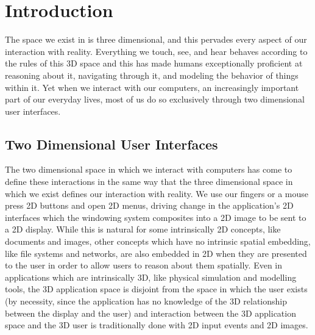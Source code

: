 \chapter{Introduction}
The space we exist in is three dimensional, and this pervades every aspect of our interaction with reality. Everything we touch, see, and hear behaves according to the rules of this 3D space and this has made humans exceptionally proficient at reasoning about it, navigating through it, and modeling the behavior of things within it. Yet when we interact with our computers, an increasingly important part of our everyday lives, most of us do so exclusively through two dimensional user interfaces. 
 
\section{Two Dimensional User Interfaces}

The two dimensional space in which we interact with computers has come to define these interactions in the same way that the three dimensional space in which we exist defines our interaction with reality. We use our fingers or a mouse press 2D buttons and open 2D menus, driving change in the application’s 2D interfaces which the windowing system composites into a 2D image to be sent to a 2D display. While this is natural for some intrinsically 2D concepts, like documents and images, other concepts which have no intrinsic spatial embedding, like file systems and networks, are also embedded in 2D when they are presented to the user in order to allow users to reason about them spatially. Even in applications which are intrinsically 3D, like physical simulation and modelling tools, the 3D application space is disjoint from the space in which the user exists (by necessity, since the application has no knowledge of the 3D relationship between the display and the user) and interaction between the 3D application space and the 3D user is traditionally done with 2D input events and 2D images.  
	
